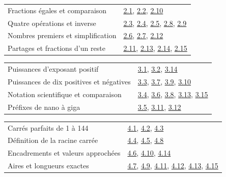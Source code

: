 \begin{tabularx}{\linewidth}{@{}Yl@{}}\toprule
Fractions égales et comparaison & \hyperref[exo-2-1]{2.1}, \hyperref[exo-2-2]{2.2}, \hyperref[exo-2-10]{2.10}\\[2mm]
Quatre opérations et inverse & \hyperref[exo-2-3]{2.3}, \hyperref[exo-2-4]{2.4}, \hyperref[exo-2-5]{2.5}, \hyperref[exo-2-8]{2.8}, \hyperref[exo-2-9]{2.9}\\[2mm]
Nombres premiers et simplification & \hyperref[exo-2-6]{2.6}, \hyperref[exo-2-7]{2.7}, \hyperref[exo-2-12]{2.12}\\[2mm]
Partages et fractions d’un reste & \hyperref[exo-2-11]{2.11}, \hyperref[exo-2-13]{2.13}, \hyperref[exo-2-14]{2.14}, \hyperref[exo-2-15]{2.15}\\[2mm]
\bottomrule\end{tabularx}\par\vspace{4mm}
\begin{tabularx}{\linewidth}{@{}Yl@{}}\toprule
Puissances d’exposant positif & \hyperref[exo-3-1]{3.1}, \hyperref[exo-3-2]{3.2}, \hyperref[exo-3-14]{3.14}\\[2mm]
Puissances de dix positives et négatives & \hyperref[exo-3-3]{3.3}, \hyperref[exo-3-7]{3.7}, \hyperref[exo-3-9]{3.9}, \hyperref[exo-3-10]{3.10}\\[2mm]
Notation scientifique et comparaison & \hyperref[exo-3-4]{3.4}, \hyperref[exo-3-6]{3.6}, \hyperref[exo-3-8]{3.8}, \hyperref[exo-3-13]{3.13}, \hyperref[exo-3-15]{3.15}\\[2mm]
Préfixes de nano à giga & \hyperref[exo-3-5]{3.5}, \hyperref[exo-3-11]{3.11}, \hyperref[exo-3-12]{3.12}\\[2mm]
\bottomrule\end{tabularx}\par\vspace{4mm}
\clearpage
{}\fontsize{10}{13}\selectfont
{}\begin{tabularx}{\linewidth}{@{}Yl@{}}\toprule
Carrés parfaits de 1 à 144 & \hyperref[exo-4-1]{4.1}, \hyperref[exo-4-2]{4.2}, \hyperref[exo-4-3]{4.3}\\[2mm]
Définition de la racine carrée & \hyperref[exo-4-4]{4.4}, \hyperref[exo-4-5]{4.5}, \hyperref[exo-4-8]{4.8}\\[2mm]
Encadrements et valeurs approchées & \hyperref[exo-4-6]{4.6}, \hyperref[exo-4-10]{4.10}, \hyperref[exo-4-14]{4.14}\\[2mm]
Aires et longueurs exactes & \hyperref[exo-4-7]{4.7}, \hyperref[exo-4-9]{4.9}, \hyperref[exo-4-11]{4.11}, \hyperref[exo-4-12]{4.12}, \hyperref[exo-4-13]{4.13}, \hyperref[exo-4-15]{4.15}\\[2mm]
\bottomrule\end{tabularx}\par\vspace{4mm}
